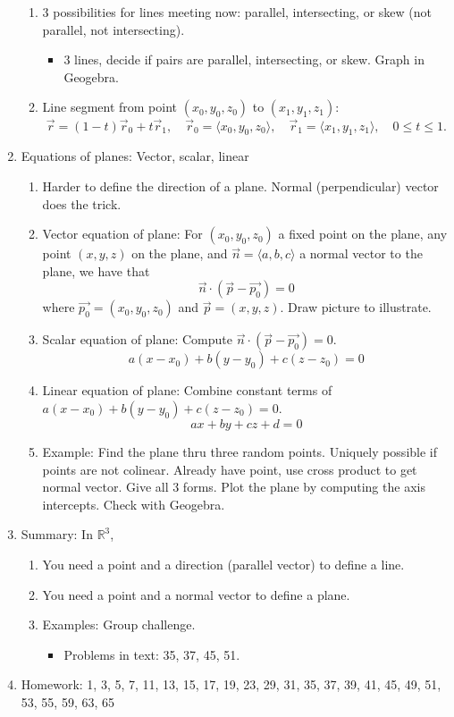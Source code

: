 \documentclass{article}
\begin{document}
\begin{enumerate}
\begin{enumerate}
\item 3 possibilities for lines meeting now: parallel, intersecting, or skew (not parallel, not intersecting).
\begin{itemize}
\item 3 lines, decide if pairs are parallel, intersecting, or skew. Graph in Geogebra.
\end{itemize}

\item Line segment from point $(x_0, y_0, z_0)$ to $(x_1, y_1, z_1)$:
\[
\vec{r} = (1-t) \vec{r}_0 + t\vec{r}_1, \quad \vec{r}_0 = \langle x_0, y_0, z_0 \rangle, \quad \vec{r}_1 = \langle x_1, y_1, z_1 \rangle, \quad 0 \leq t \leq 1.
\]
\end{enumerate}

\item Equations of planes: Vector, scalar, linear
\begin{enumerate}
\item Harder to define the direction of a plane. Normal (perpendicular) vector does the trick.
\item Vector equation of plane: For $(x_0, y_0, z_0)$ a fixed point on the plane, any point $(x,y,z)$ on the plane, and $\vec{n}=\langle a,b,c \rangle$ a normal vector to the plane, we have that
\[
\vec{n} \cdot (\vec{p}-\vec{p_0}) = 0
\]
where $\vec{p_0}=(x_0,y_0,z_0)$ and $\vec{p}=(x,y,z)$. Draw picture to illustrate.
\item Scalar equation of plane:  Compute $\vec{n} \cdot (\vec{p}-\vec{p_0}) = 0$.
\[
a(x-x_0) + b(y-y_0) + c(z-z_0) = 0
\]
\item Linear equation of plane: Combine constant terms of $a(x-x_0) + b(y-y_0) + c(z-z_0) = 0$.
\[
ax+by+cz+d=0
\]
\item Example: Find the plane thru three random points. Uniquely possible if points are not colinear. Already have point, use cross product to get normal vector. Give all 3 forms. Plot the plane by computing the axis intercepts. Check with Geogebra.
\end{enumerate}

\item Summary: In $\mathbb{R}^3$,
\begin{enumerate}
\item You need a point and a direction (parallel vector) to define a line.
\item You need a point and a normal vector to define a plane.
\item Examples: Group challenge.
\begin{itemize}
\item Problems in text: 35, 37, 45, 51.
\end{itemize}
\end{enumerate}

\item Homework: 1, 3, 5, 7, 11, 13, 15, 17, 19, 23, 29, 31, 35, 37, 39, 41, 45, 49, 51, 53, 55, 59, 63, 65 

\end{enumerate}
\end{document}
